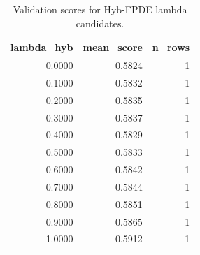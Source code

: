 \begin{table}[t]
\caption{Validation scores for Hyb-FPDE lambda candidates.}
\label{tab:lambda_distribution_computed}
\centering
\begin{tabular}{rrr}
\toprule
lambda\_hyb & mean\_score & n\_rows \\
\midrule
0.0000 & 0.5824 & 1 \\
0.1000 & 0.5832 & 1 \\
0.2000 & 0.5835 & 1 \\
0.3000 & 0.5837 & 1 \\
0.4000 & 0.5829 & 1 \\
0.5000 & 0.5833 & 1 \\
0.6000 & 0.5842 & 1 \\
0.7000 & 0.5844 & 1 \\
0.8000 & 0.5851 & 1 \\
0.9000 & 0.5865 & 1 \\
1.0000 & 0.5912 & 1 \\
\bottomrule
\end{tabular}

\end{table}
